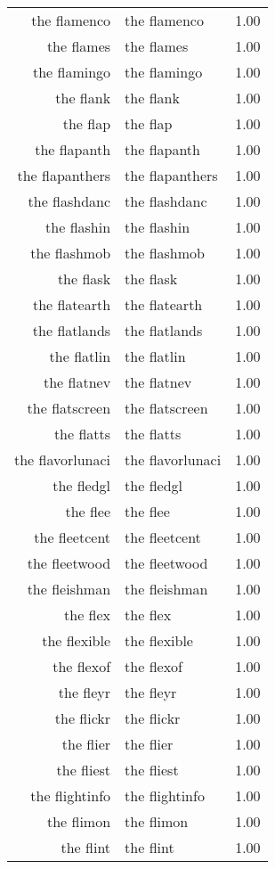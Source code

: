 \begin{table}[ht]
\begin{tabular}{rlr}
  the flamenco & the flamenco & 1.00 \\ 
  the flames & the flames & 1.00 \\ 
  the flamingo & the flamingo & 1.00 \\ 
  the flank & the flank & 1.00 \\ 
  the flap & the flap & 1.00 \\ 
  the flapanth & the flapanth & 1.00 \\ 
  the flapanthers & the flapanthers & 1.00 \\ 
  the flashdanc & the flashdanc & 1.00 \\ 
  the flashin & the flashin & 1.00 \\ 
  the flashmob & the flashmob & 1.00 \\ 
  the flask & the flask & 1.00 \\ 
  the flatearth & the flatearth & 1.00 \\ 
  the flatlands & the flatlands & 1.00 \\ 
  the flatlin & the flatlin & 1.00 \\ 
  the flatnev & the flatnev & 1.00 \\ 
  the flatscreen & the flatscreen & 1.00 \\ 
  the flatts & the flatts & 1.00 \\ 
  the flavorlunaci & the flavorlunaci & 1.00 \\ 
  the fledgl & the fledgl & 1.00 \\ 
  the flee & the flee & 1.00 \\ 
  the fleetcent & the fleetcent & 1.00 \\ 
  the fleetwood & the fleetwood & 1.00 \\ 
  the fleishman & the fleishman & 1.00 \\ 
  the flex & the flex & 1.00 \\ 
  the flexible & the flexible & 1.00 \\ 
  the flexof & the flexof & 1.00 \\ 
  the fleyr & the fleyr & 1.00 \\ 
  the flickr & the flickr & 1.00 \\ 
  the flier & the flier & 1.00 \\ 
  the fliest & the fliest & 1.00 \\ 
  the flightinfo & the flightinfo & 1.00 \\ 
  the flimon & the flimon & 1.00 \\ 
  the flint & the flint & 1.00 \\ 

\end{tabular}
\end{table}
